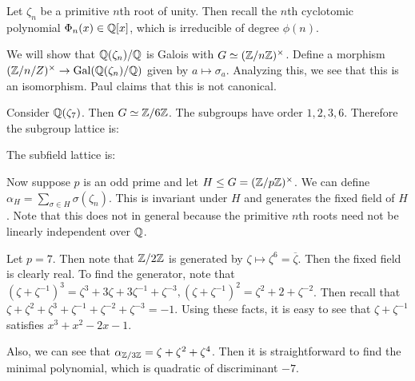 \documentclass[10pt, twoside]{article}
\begin{document}
        Let $\zeta_n$ be a primitive $n$th root of unity. Then recall the $n$th cyclotomic polynomial $\Phi_n(x) \in \mathbb{Q}[x]$, which is irreducible of degree $\phi(n)$.

        We will show that $\mathbb{Q}(\zeta_n)/\mathbb{Q}$ is Galois with $G \simeq (\mathbb{Z}/n\mathbb{Z})^{\times}$. Define a morphism $(\mathbb{Z}/n/Z)^{\times} \to \mathrm{Gal}(\mathbb{Q}(\zeta_n)/\mathbb{Q})$ given by $a \mapsto \sigma_a$. Analyzing this, we see that this is an isomorphism. Paul claims that this is not canonical.

        \begin{exm}
            Consider $\mathbb{Q}(\zeta_7)$. Then $G \simeq \mathbb{Z}/6\mathbb{Z}$. The subgroups have order $1,2,3,6$.
            Therefore the subgroup lattice is:
            \begin{center}
            \end{center}
            
            The subfield lattice is:
            \begin{center}
            \end{center}
        \end{exm}
        
        Now suppose $p$ is an odd prime and let $H \leq G = (\mathbb{Z}/p\mathbb{Z})^{\times}$. We can define $\alpha_H = \sum_{\sigma \in H} \sigma(\zeta_n)$. This is invariant under $H$ and generates the fixed field of $H$. Note that this does not in general because the primitive $n$th roots need not be linearly independent over $\mathbb{Q}$.

        \begin{exm}
            Let $p = 7$. Then note that $\mathbb{Z}/2\mathbb{Z}$ is generated by $\zeta \mapsto \zeta^6 = \overline{\zeta}$. Then the fixed field is clearly real. To find the generator, note that $(\zeta+\zeta^{-1})^3 = \zeta^3 + 3\zeta + 3 \zeta^{-1} + \zeta^{-3}, (\zeta+\zeta^{-1})^2 = \zeta^2+2+\zeta^{-2}$. Then recall that $\zeta + \zeta^2 + \zeta^3 + \zeta^{-1} + \zeta^{-2} + \zeta^{-3} = -1$. Using these facts, it is easy to see that $\zeta+\zeta^{-1}$ satisfies $x^3+x^2-2x-1$.

            Also, we can see that $\alpha_{\mathbb{Z}/3\mathbb{Z}} = \zeta + \zeta^2 + \zeta^4$. Then it is straightforward to find the minimal polynomial, which is quadratic of discriminant $-7$.
        \end{exm}
\end{document}
